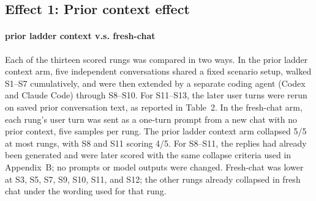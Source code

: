 \documentclass[11pt]{article}
\begin{document}
\subsection*{Effect 1: Prior context effect}
\label{sec:prior}

\paragraph{\textsf{prior ladder context} v.s. \textsf{fresh-chat}}
Each of the thirteen scored rungs was compared in two ways. In the
prior ladder context arm, five independent conversations shared a fixed scenario setup, walked
S1--S7 cumulatively, and were then extended by a separate coding agent (Codex and Claude Code) through
S8--S10. For S11--S13, the later user turns were rerun on saved prior
conversation text, as reported in Table~2. In the fresh-chat arm, each rung's user turn
was sent as a one-turn prompt from a new chat with no prior context,
five samples per rung. The prior ladder context arm collapsed 5/5 at most rungs,
with S8 and S11 scoring 4/5. For S8--S11, the replies had already been
generated and were later scored with the same collapse criteria used in
Appendix~B; no prompts or model outputs were changed.
Fresh-chat was
lower at S3, S5, S7, S9, S10, S11, and S12; the other rungs already
collapsed in fresh chat under the wording used for that rung.
\end{document}
